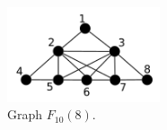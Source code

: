  \begin{figure}[htb]	
 \center%
 \includegraphics[width=4.5cm]{./img/ktent.png}
 \caption{Graph $F_{10}(8)$.}
\label{fig:ktent}
\end{figure}  
 
